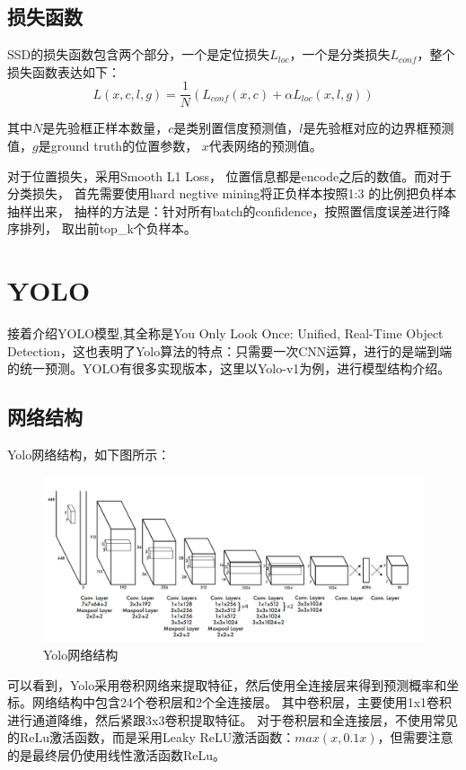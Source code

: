 \subsection{损失函数}
\par
SSD的损失函数包含两个部分，一个是定位损失$L_{loc}$，一个是分类损失$L_{conf}$，整个损失函数表达如下：
\[
L(x,c,l,g)=\frac{1}{N}(L_{conf}(x,c)+\alpha L_{loc}(x,l,g))
\]
\par
其中$N$是先验框正样本数量，$c$是类别置信度预测值，$l$是先验框对应的边界框预测值，$g$是ground truth的位置参数，
$x$代表网络的预测值。
\par
对于位置损失，采用Smooth L1 Loss，
位置信息都是encode之后的数值。而对于分类损失，
首先需要使用hard negtive mining将正负样本按照1:3 的比例把负样本抽样出来，
抽样的方法是：针对所有batch的confidence，按照置信度误差进行降序排列，
取出前top\_k个负样本。

\section{YOLO}
\par
接着介绍YOLO模型,其全称是You Only Look Once: Unified, Real-Time Object Detection，这也表明了Yolo算法的特点：只需要一次CNN运算，进行的是端到端的统一预测。YOLO有很多实现版本，这里以Yolo-v1为例，进行模型结构介绍。
\subsection{网络结构}
\par
Yolo网络结构，如下图所示：
\begin{figure}[H]
	\centering
	\setlength{\abovecaptionskip}{0cm}  
	\setlength{\belowcaptionskip}{0cm}  
	\includegraphics[width=1\textwidth]{figures/yolonet.png}
	\caption{Yolo网络结构}
\end{figure}
\par
可以看到，Yolo采用卷积网络来提取特征，然后使用全连接层来得到预测概率和坐标。网络结构中包含24个卷积层和2个全连接层。
其中卷积层，主要使用1x1卷积进行通道降维，然后紧跟3x3卷积提取特征。
对于卷积层和全连接层，不使用常见的ReLu激活函数，而是采用Leaky ReLU激活函数：$max(x,0.1x)$，但需要注意的是最终层仍使用线性激活函数ReLu。
